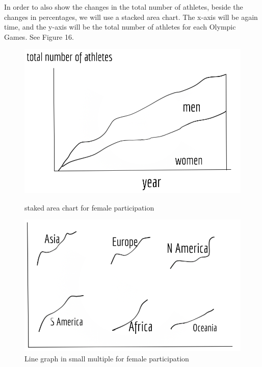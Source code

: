 \documentclass[12pt]{article}
\begin{document}
In order to also show the changes in the total number of athletes, beside the changes in percentages, we will use a stacked area chart. The x-axis will be again time, and the y-axis will be the total number of athletes for each Olympic Games. See Figure 16.

\begin{figure}[!b]
  \begin{minipage}[b]{0.45\textwidth}
  \centering
    \includegraphics[scale=0.3]{pics/3.png}
    \caption{\small staked area chart for female participation}
    \label{fig:1}
  \end{minipage}
  \hfill
  \begin{minipage}[b]{0.45\textwidth}
  \centering
    \includegraphics[scale=0.3]{pics/4.png}
    \caption{\small Line graph in small multiple for female participation}
    \label{fig:2}
  \end{minipage}
\end{figure}
\end{document}
